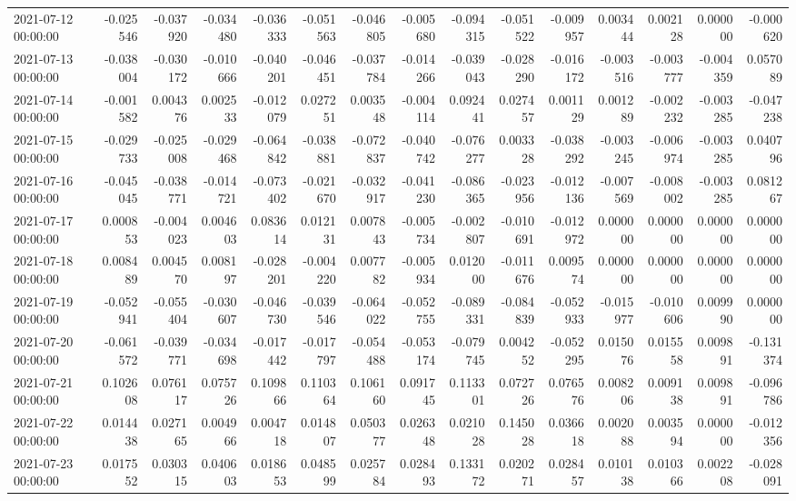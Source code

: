 \begin{tabular}{lrrrrrrrrrrrrrr}
2021-07-12 00:00:00 & -0.025546 & -0.037920 & -0.034480 & -0.036333 & -0.051563 & -0.046805 & -0.005680 & -0.094315 & -0.051522 & -0.009957 & 0.003444 & 0.002128 & 0.000000 & -0.000620 \\
2021-07-13 00:00:00 & -0.038004 & -0.030172 & -0.010666 & -0.040201 & -0.046451 & -0.037784 & -0.014266 & -0.039043 & -0.028290 & -0.016172 & -0.003516 & -0.003777 & -0.004359 & 0.057089 \\
2021-07-14 00:00:00 & -0.001582 & 0.004376 & 0.002533 & -0.012079 & 0.027251 & 0.003548 & -0.004114 & 0.092441 & 0.027457 & 0.001129 & 0.001289 & -0.002232 & -0.003285 & -0.047238 \\
2021-07-15 00:00:00 & -0.029733 & -0.025008 & -0.029468 & -0.064842 & -0.038881 & -0.072837 & -0.040742 & -0.076277 & 0.003328 & -0.038292 & -0.003245 & -0.006974 & -0.003285 & 0.040796 \\
2021-07-16 00:00:00 & -0.045045 & -0.038771 & -0.014721 & -0.073402 & -0.021670 & -0.032917 & -0.041230 & -0.086365 & -0.023956 & -0.012136 & -0.007569 & -0.008002 & -0.003285 & 0.081267 \\
2021-07-17 00:00:00 & 0.000853 & -0.004023 & 0.004603 & 0.083614 & 0.012131 & 0.007843 & -0.005734 & -0.002807 & -0.010691 & -0.012972 & 0.000000 & 0.000000 & 0.000000 & 0.000000 \\
2021-07-18 00:00:00 & 0.008489 & 0.004570 & 0.008197 & -0.028201 & -0.004220 & 0.007782 & -0.005934 & 0.012000 & -0.011676 & 0.009574 & 0.000000 & 0.000000 & 0.000000 & 0.000000 \\
2021-07-19 00:00:00 & -0.052941 & -0.055404 & -0.030607 & -0.046730 & -0.039546 & -0.064022 & -0.052755 & -0.089331 & -0.084839 & -0.052933 & -0.015977 & -0.010606 & 0.009990 & 0.000000 \\
2021-07-20 00:00:00 & -0.061572 & -0.039771 & -0.034698 & -0.017442 & -0.017797 & -0.054488 & -0.053174 & -0.079745 & 0.004252 & -0.052295 & 0.015076 & 0.015558 & 0.009891 & -0.131374 \\
2021-07-21 00:00:00 & 0.102608 & 0.076117 & 0.075726 & 0.109866 & 0.110364 & 0.106160 & 0.091745 & 0.113301 & 0.072726 & 0.076576 & 0.008206 & 0.009138 & 0.009891 & -0.096786 \\
2021-07-22 00:00:00 & 0.014438 & 0.027165 & 0.004966 & 0.004718 & 0.014807 & 0.050377 & 0.026348 & 0.021028 & 0.145028 & 0.036618 & 0.002088 & 0.003594 & 0.000000 & -0.012356 \\
2021-07-23 00:00:00 & 0.017552 & 0.030315 & 0.040603 & 0.018653 & 0.048599 & 0.025784 & 0.028493 & 0.133172 & 0.020271 & 0.028457 & 0.010138 & 0.010366 & 0.002208 & -0.028091 \\

\end{tabular}

